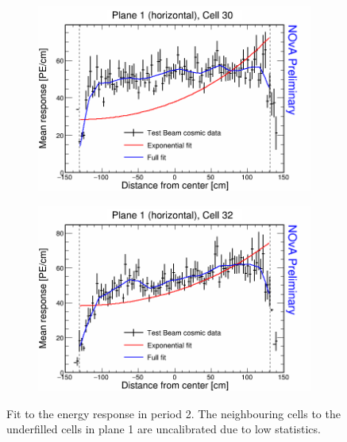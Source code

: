 \begin{figure}[h]
  \begin{subfigure}{0.5\textwidth}
    \includegraphics[width=\linewidth]{RelativeCalibrationResults/p2_001_030.png}
  \end{subfigure}
  \begin{subfigure}{0.5\textwidth}
    \includegraphics[width=\linewidth]{RelativeCalibrationResults/p2_001_032.png}
  \end{subfigure}
  \caption{Fit to the energy response in period 2. The neighbouring cells to the underfilled cells in plane 1 are uncalibrated due to low statistics.}
  \label{fig:AttenfitResultsPerio2_UnderfilledCellsPlane01}
\end{figure}

